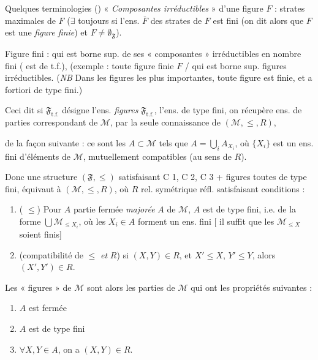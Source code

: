 \documentclass[11pt,a4paper]{article}
\begin{document}
Quelques terminologies () « \emph{Composantes irréductibles} » d'une figure $F$ : strates maximales de $F$ ($\exists$ toujours si l'ens. $\overline{F}$ des strates de $F$ est fini (on dit alors que $F$ est une \emph{figure finie}) et $F \neq \emptyset_{\mathfrak{F}}$).

Figure   fini : qui est borne sup. de ses « composantes » irréductibles en nombre fini ( est de t.f.), (exemple : toute figure finie $F$ / qui est \struck{\ill{}} borne sup.  \ill{} figures irréductibles. \ill{} (\emph{NB} Dans les figures les plus importantes, toute figure est finie, et a fortiori de type fini.)

Ceci dit si $\mathfrak{F}_{\mathrm{t.f.}}$ désigne l'ens. \emph{figures} $\mathfrak{F}_{\mathrm{t.f.}}$, l'ens. de type fini, on récupère \ill{} ens. de parties correspondant de $\mathcal{M}$, par la seule connaissance de $(\mathcal{M}, \leq, R)$,

de la façon suivante : ce sont les $A \subset \mathcal{M}$ tels que $A = \bigcup_i A_{X_i}$, où $\lbrace X_i \rbrace$ \struck{\ill{}} est un ens. fini d'éléments de $\mathcal{M}$, mutuellement compatibles (au sens de $R$).

Donc une structure $(\mathfrak{F}, \leq)$ satisfaisant C 1, C 2, C 3 + figures toutes de type fini, équivaut à $(\mathcal{M}, \leq, R)$, où $R$ rel. symétrique réfl.  satisfaisant  conditions :
\begin{enumerate}
  \item[a)] \struck{\ill{}} ( \ill{} $\leq$) Pour $A$ partie fermée \emph{majorée} $A$ de $\mathcal{M}$, $A$ est de type fini, i.e. de la forme $\bigcup \mathcal{M}_{\leq X_i}$, où les $X_i \in A$ forment un ens. fini [\ill{} il suffit que les $\mathcal{M}_{\leq X}$ soient finis]
  \item[b)] (compatibilité de $\leq$ \emph{et} $R$) si $(X, Y) \in R$, et $X' \leq X$, $Y' \leq Y$, alors $(X', Y') \in R$.
\end{enumerate}

Les « figures » de $\mathcal{M}$ sont alors les parties   de $\mathcal{M}$ qui ont les propriétés suivantes :
\begin{enumerate}
  \item[a)] $A$ est fermée
  \item[b)] $A$ est de type fini
  \item[c)] $\forall X, Y \in A$, on a $(X, Y) \in R$.
\end{enumerate}
\end{document}

